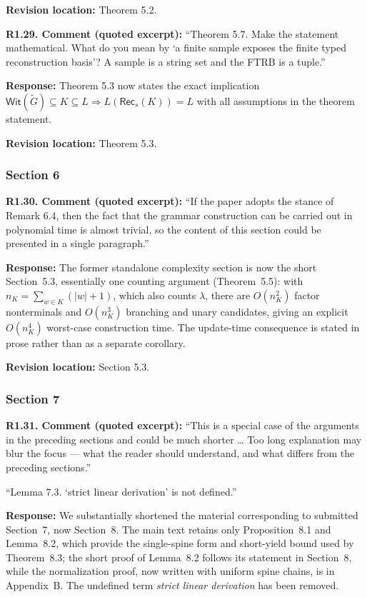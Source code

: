 \documentclass[
  10pt,
  a4paper,
]{article}
\begin{document}
\textbf{Revision location:} Theorem 5.2.


\textbf{R1.29. Comment (quoted excerpt):} ``Theorem 5.7. Make the statement
mathematical. What do you mean by `a finite sample exposes the finite
typed reconstruction basis'? A sample is a string set and the FTRB is a
tuple.''

\textbf{Response:} Theorem 5.3 now states the exact implication
\(\mathsf{Wit}(\widetilde G)\subseteq K\subseteq L\Rightarrow L(\mathsf{Rec}_s(K))=L\)
with all assumptions in the theorem statement.

\textbf{Revision location:} Theorem 5.3.


\subsubsection{Section 6}\label{section-6}

\textbf{R1.30. Comment (quoted excerpt):} ``If the paper adopts the stance of
Remark 6.4, then the fact that the grammar construction can be carried
out in polynomial time is almost trivial, so the content of this section
could be presented in a single paragraph.''

\textbf{Response:} The former standalone complexity section is now the
short Section~5.3, essentially one counting argument (Theorem~5.5): with
\(n_K=\sum_{w\in K}(|w|+1)\), which also counts \(\lambda\), there are
\(O(n_K^2)\) factor nonterminals and \(O(n_K^3)\) branching and unary
candidates, giving an explicit \(O(n_K^4)\) worst-case construction time.
The update-time consequence is stated in prose rather than as a separate
corollary.

\textbf{Revision location:} Section 5.3.


\subsubsection{Section 7}\label{section-7}

\textbf{R1.31. Comment (quoted excerpt):} ``This is a special case of the
arguments in the preceding sections and could be much shorter \ldots{}
Too long explanation may blur the focus --- what the reader should
understand, and what differs from the preceding sections.''

``Lemma 7.3. `strict linear derivation' is not defined.''

\textbf{Response:} We substantially shortened the material corresponding to submitted Section~7,
now Section~8. The main text retains only Proposition~8.1 and Lemma~8.2,
which provide the single-spine form and short-yield bound used by
Theorem~8.3; the short proof of Lemma~8.2 follows its statement in Section~8,
while the normalization proof, now written with uniform spine
chains, is in Appendix~B.
The undefined term \emph{strict linear derivation} has been removed.
\end{document}
